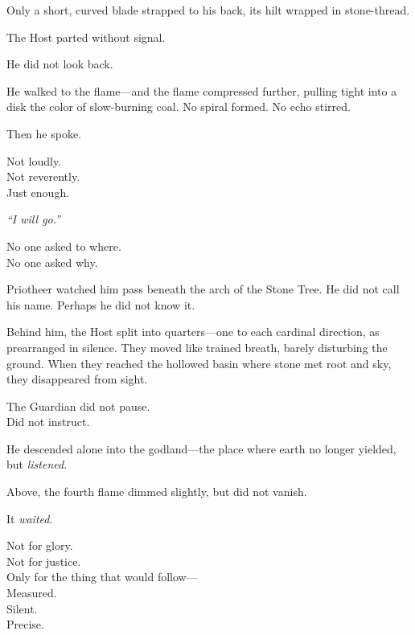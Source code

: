 \documentclass[9pt]{article}
\begin{document}
\vspace{0.5em}
Only a short, curved blade strapped to his back, its hilt wrapped in stone-thread.

\vspace{0.5em}
The Host parted without signal.

\vspace{0.5em}
He did not look back.

\vspace{0.5em}
He walked to the flame---and the flame compressed further, pulling tight into a disk the color of slow-burning coal. No spiral formed. No echo stirred.

\vspace{0.5em}
Then he spoke.

\vspace{0.5em}
Not loudly.\\
Not reverently.\\
Just enough.

\vspace{0.5em}
\textit{``I will go.''}

\vspace{0.5em}
No one asked to where.\\
No one asked why.

\vspace{0.5em}
Priotheer watched him pass beneath the arch of the Stone Tree. He did not call his name. Perhaps he did not know it.

\vspace{0.5em}
Behind him, the Host split into quarters---one to each cardinal direction, as prearranged in silence. They moved like trained breath, barely disturbing the ground. When they reached the hollowed basin where stone met root and sky, they disappeared from sight.

\vspace{0.5em}
The Guardian did not pause.\\
Did not instruct.

\vspace{0.5em}
He descended alone into the godland---the place where earth no longer yielded, but \textit{listened}.

\vspace{0.5em}
Above, the fourth flame dimmed slightly, but did not vanish.

\vspace{0.5em}
It \textit{waited}.

\vspace{0.5em}
Not for glory.\\
Not for justice.\\
Only for the thing that would follow---\\
Measured.\\
Silent.\\
Precise.
\end{document}
